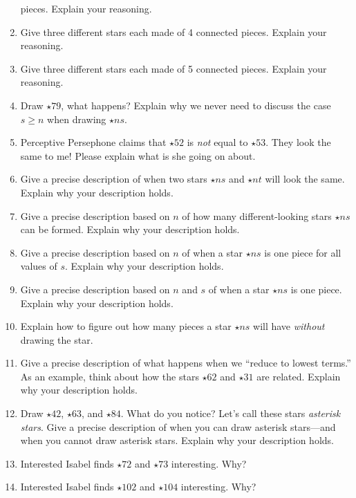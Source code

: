 \begin{enumerate}
  pieces. Explain your reasoning.
\item Give three different stars each made of 4 connected
  pieces. Explain your reasoning.
\item Give three different stars each made of 5 connected
  pieces. Explain your reasoning.
\item Draw $\star{7}{9}$, what happens? Explain why we never need to
  discuss the case $s\ge n$ when drawing $\star{n}{s}$.
\item Perceptive Persephone claims that $\star{5}{2}$ is \textit{not}
  equal to $\star{5}{3}$. They look the same to me! Please explain
  what is she going on about.
\item Give a precise description of when two stars $\star{n}{s}$ and
  $\star{n}{t}$ will look the same. Explain why your description
  holds.
\item Give a precise description based on $n$ of how many different-looking
 stars $\star{n}{s}$ can be formed. Explain why your
  description holds.
\item Give a precise description based on $n$ of when a star
  $\star{n}{s}$ is one piece for all values of $s$. Explain why your
  description holds.
\item Give a precise description based on $n$ and $s$ of when a star
  $\star{n}{s}$ is one piece. Explain why your description holds.
\item Explain how to figure out how many pieces a star $\star{n}{s}$
  will have \textit{without} drawing the star.
\item Give a precise description of what happens when we ``reduce to
  lowest terms.'' As an example, think about how the stars
  $\star{6}{2}$ and $\star{3}{1}$ are related. Explain why your
  description holds.
\item Draw $\star{4}{2}$, $\star{6}{3}$, and $\star{8}{4}$.  What do you
  notice? Let's call these stars \textit{asterisk stars}. Give a precise
  description of when you can draw asterisk stars---and when you cannot
  draw asterisk stars. Explain why your description holds.
\item Interested Isabel finds $\star{7}{2}$ and $\star{7}{3}$
  interesting. Why?
\item Interested Isabel finds $\star{10}{2}$ and $\star{10}{4}$
  interesting. Why?
\end{enumerate}

\newpage











